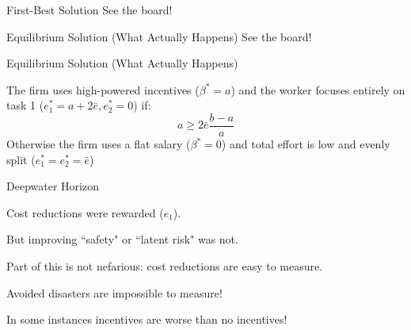 \documentclass[aspectratio=169,usenames,dvipsnames]{beamer}
\newenvironment{wideitemize}{\itemize\addtolength{\itemsep}{10pt}}{\enditemize}
\begin{document}
\begin{frame}{First-Best Solution}
\centering
    \huge See the board!
\end{frame}

\begin{frame}{Equilibrium Solution (What Actually Happens)}
\centering
    \huge See the board!
\end{frame}

\begin{frame}{Equilibrium Solution (What Actually Happens)}
\begin{theorem}
    The firm uses high-powered incentives ($\beta^*=a$) and the worker focuses entirely on task 1 ($e_1^*=a + 2\bar e, e_2^*=0$) if:
\[a \geq 2\bar e\frac{ b - a }{a}\]
    Otherwise the firm uses a flat salary ($\beta^*=0$) and total effort is low and evenly split ($e_1^*=e_2^*=\bar e$)
\end{theorem}
\end{frame}


\begin{frame}{Deepwater Horizon}

\begin{wideitemize}
    \item Cost reductions were rewarded ($e_1$).
    \item But improving ``safety" or ``latent risk" was not.
    \item Part of this is not nefarious: cost reductions are easy to measure.
    \item Avoided disasters are impossible to measure!
    \item In some instances incentives are worse than no incentives!
\end{wideitemize}

\end{frame}
\end{document}
